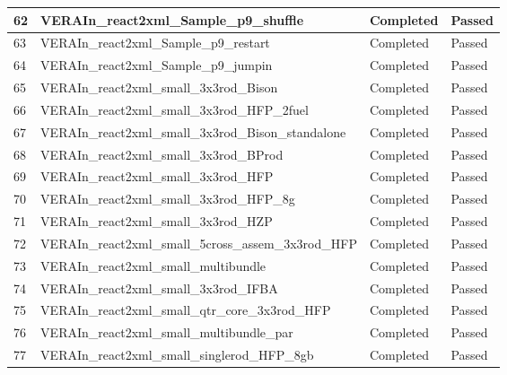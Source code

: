 \begin{longtable}[!ht]{|p{0.75cm}|p{11.25cm}|p{1.6cm}|p{1.1cm}|}
\rowcolor{caslcolor2}\small 62 & \small VERAIn\_react2xml\_Sample\_p9\_shuffle & \small Completed & \small Passed \\\hline
\rowcolor{caslcolor1}\small 63 & \small VERAIn\_react2xml\_Sample\_p9\_restart & \small Completed & \small Passed \\\hline
\rowcolor{caslcolor2}\small 64 & \small VERAIn\_react2xml\_Sample\_p9\_jumpin & \small Completed & \small Passed \\\hline
\rowcolor{caslcolor1}\small 65 & \small VERAIn\_react2xml\_small\_3x3rod\_Bison & \small Completed & \small Passed \\\hline
\rowcolor{caslcolor2}\small 66 & \small VERAIn\_react2xml\_small\_3x3rod\_HFP\_2fuel & \small Completed & \small Passed \\\hline
\rowcolor{caslcolor1}\small 67 & \small VERAIn\_react2xml\_small\_3x3rod\_Bison\_standalone & \small Completed & \small Passed \\\hline
\rowcolor{caslcolor2}\small 68 & \small VERAIn\_react2xml\_small\_3x3rod\_BProd & \small Completed & \small Passed \\\hline
\rowcolor{caslcolor1}\small 69 & \small VERAIn\_react2xml\_small\_3x3rod\_HFP & \small Completed & \small Passed \\\hline
\rowcolor{caslcolor2}\small 70 & \small VERAIn\_react2xml\_small\_3x3rod\_HFP\_8g & \small Completed & \small Passed \\\hline
\rowcolor{caslcolor1}\small 71 & \small VERAIn\_react2xml\_small\_3x3rod\_HZP & \small Completed & \small Passed \\\hline
\rowcolor{caslcolor2}\small 72 & \small VERAIn\_react2xml\_small\_5cross\_assem\_3x3rod\_HFP & \small Completed & \small Passed \\\hline
\rowcolor{caslcolor1}\small 73 & \small VERAIn\_react2xml\_small\_multibundle & \small Completed & \small Passed \\\hline
\rowcolor{caslcolor2}\small 74 & \small VERAIn\_react2xml\_small\_3x3rod\_IFBA & \small Completed & \small Passed \\\hline
\rowcolor{caslcolor1}\small 75 & \small VERAIn\_react2xml\_small\_qtr\_core\_3x3rod\_HFP & \small Completed & \small Passed \\\hline
\rowcolor{caslcolor2}\small 76 & \small VERAIn\_react2xml\_small\_multibundle\_par & \small Completed & \small Passed \\\hline
\rowcolor{caslcolor1}\small 77 & \small VERAIn\_react2xml\_small\_singlerod\_HFP\_8gb & \small Completed & \small Passed \\\hline

\end{longtable}
